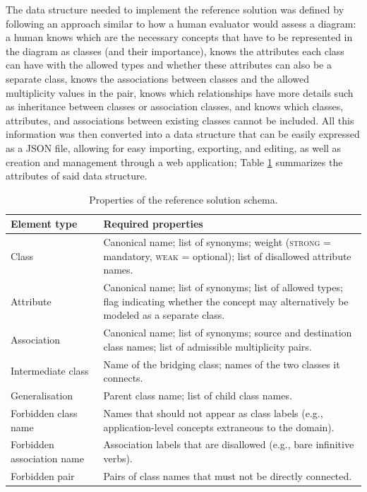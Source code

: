 
The data structure needed to implement the reference solution was defined by following an approach similar to how a human evaluator would assess a diagram: a human knows which are the necessary concepts that have to be represented in the diagram as classes (and their importance), knows the attributes each class can have with the allowed types and whether these attributes can also be a separate class, knows the associations between classes and the allowed multiplicity values in the pair, knows which relationships have more details such as inheritance between classes or association classes, and knows which classes, attributes, and associations between existing classes cannot be included. All this information was then converted into a data structure that can be easily expressed as a JSON file, allowing for easy importing, exporting, and editing, as well as creation and management through a web application; Table \ref{tab:solution_schema} summarizes the attributes of said data structure.

\begin{table}[ht]
  \centering
  \caption{Properties of the reference solution schema.}
  \label{tab:solution_schema}
  \small
  \begin{tabular}{lp{8cm}}
    \toprule
    \textbf{Element type} & \textbf{Required properties} \\
    \midrule
    Class & Canonical name; list of synonyms; weight (\textsc{strong} = mandatory, \textsc{weak} = optional); list of disallowed attribute names. \\
    Attribute & Canonical name; list of synonyms; list of allowed types; flag indicating whether the concept may alternatively be modeled as a separate class. \\
    Association & Canonical name; list of synonyms; source and destination class names; list of admissible multiplicity pairs. \\
    Intermediate class & Name of the bridging class; names of the two classes it connects. \\
    Generalisation & Parent class name; list of child class names. \\
    Forbidden class name & Names that should not appear as class labels (e.g., application-level concepts extraneous to the domain). \\
    Forbidden association name & Association labels that are disallowed (e.g., bare infinitive verbs). \\
    Forbidden pair & Pairs of class names that must not be directly connected. \\
    \bottomrule
  \end{tabular}
\end{table}

